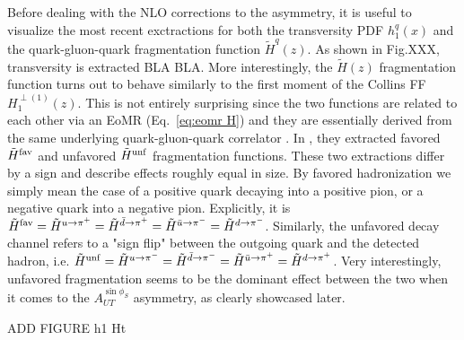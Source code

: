Before dealing with the NLO corrections to the asymmetry, it is useful to visualize the most recent exctractions for both the transversity PDF $h_1^q(x)$ and the quark-gluon-quark fragmentation function $\tilde{H}^q(z)$.  As shown in Fig.XXX, transversity is extracted BLA BLA. More interestingly, the $\tilde{H}(z)$ fragmentation function turns out to behave similarly to the first moment of the Collins FF $H_1^{\perp(1)}(z)$. This is not entirely surprising since the two functions are related to each other via an EoMR (Eq.~\eqref{eq:eomr H}) and they are essentially derived from the same underlying quark-gluon-quark correlator \cite{kanazawa_operator_2016}. In \cite{Gamberg2022Htilde}, they extracted favored $\tilde{H}^{\rm fav}$ and unfavored $\tilde{H}^{\rm unf}$ fragmentation functions. These two extractions differ by a sign and describe effects roughly equal in size. By favored hadronization we simply mean the case of a positive quark decaying into a positive pion, or a negative quark into a negative pion. Explicitly, it is $\tilde{H}^{\rm fav}=\tilde{H}^{u\to \pi^+}=\tilde{H}^{\bar{d}\to \pi^+}=\tilde{H}^{\bar{u}\to \pi^-}=\tilde{H}^{d\to \pi^-}$. Similarly, the unfavored decay channel refers to a "sign flip" between the outgoing quark and the detected hadron, i.e. $\tilde{H}^{\rm unf}=\tilde{H}^{u\to \pi^-}=\tilde{H}^{\bar{d}\to \pi^-}=\tilde{H}^{\bar{u}\to \pi^+}=\tilde{H}^{d\to \pi^+}$. Very interestingly, unfavored fragmentation seems to be the dominant effect between the two when it comes to the $A_{UT}^{\sin\phi_S}$ asymmetry, as clearly showcased later.

ADD FIGURE h1 Ht\\

